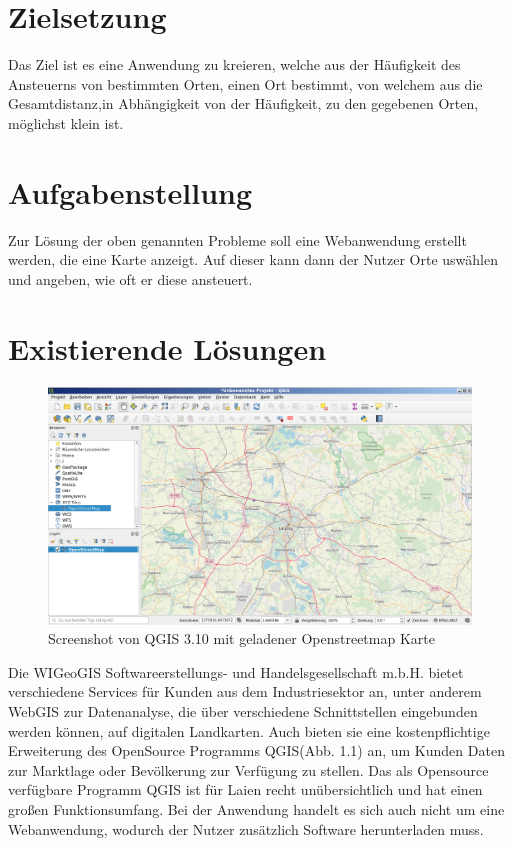 \documentclass[a4paper, 12pt]{scrreprt}
\begin{document}
\section{Zielsetzung}
Das Ziel ist es eine Anwendung zu kreieren, welche aus der Häufigkeit des Ansteuerns von bestimmten Orten, einen Ort bestimmt, von welchem aus die Gesamtdistanz,in Abhängigkeit von der Häufigkeit, zu den gegebenen Orten, möglichst klein ist.
\section{Aufgabenstellung}
Zur Lösung der oben genannten Probleme soll eine Webanwendung erstellt werden, die eine Karte anzeigt.
Auf dieser kann dann der Nutzer Orte uswählen und angeben, wie oft er diese ansteuert.
\newpage
\section{Existierende Lösungen}
\begin{figure}[h]
\includegraphics[width=\linewidth]{qgis_oberflaeche.png}
\caption{Screenshot von QGIS 3.10 mit geladener Openstreetmap Karte}
\end{figure}
Die WIGeoGIS\cite{wigeogis} Softwareerstellungs- und Handelsgesellschaft m.b.H. bietet verschiedene Services für Kunden aus dem Industriesektor an, unter anderem WebGIS zur Datenanalyse, die über verschiedene Schnittstellen eingebunden werden können, auf digitalen Landkarten. 
Auch bieten sie eine kostenpflichtige Erweiterung des OpenSource Programms QGIS(Abb. 1.1) an, um Kunden Daten zur Marktlage oder Bevölkerung zur Verfügung zu stellen.
Das als Opensource verfügbare Programm QGIS ist für Laien recht unübersichtlich und hat einen großen Funktionsumfang.
Bei der Anwendung handelt es sich auch nicht um eine Webanwendung, wodurch der Nutzer zusätzlich Software herunterladen muss.\\
\end{document}
